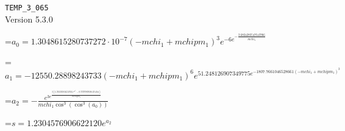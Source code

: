 \documentclass{article}
\newcommand{\exprline}[1]{\par\noindent\begingroup\setbox0=\hbox{$\displaystyle #1$}\ifdim\wd0>\linewidth\resizebox{\linewidth}{!}{\box0}\else\box0\fi\endgroup\par\medskip}
\begin{document}
\noindent\texttt{TEMP\_3\_065}\\
Version 5.3.0\\
\exprline{a_{0} = 1.3048615280737272 \cdot 10^{-7} \left(- mchi_{1} + mchipm_{1}\right)^{3} e^{- 6 e^{- \frac{3.6824283549543966}{mchi_{1}}}}}
\exprline{a_{1} = - 12550.28898243733 \left(- mchi_{1} + mchipm_{1}\right)^{6} e^{51.248126907349775 e^{- 1807.7661046528661 \left(- mchi_{1} + mchipm_{1}\right)^{3}}}}
\exprline{a_{2} = - \frac{e^{3 e^{\frac{3 \left(6.923296036632556 e^{3 e^{a_{1}}} - 0.99999890201231244\right)}{mchipm_{1}}}}}{mchi_{1} \cos^{3}{\left(\cos^{3}{\left(a_{0} \right)} \right)}}}
\exprline{s = 1.2304576906622120 e^{a_{2}}}
\end{document}
